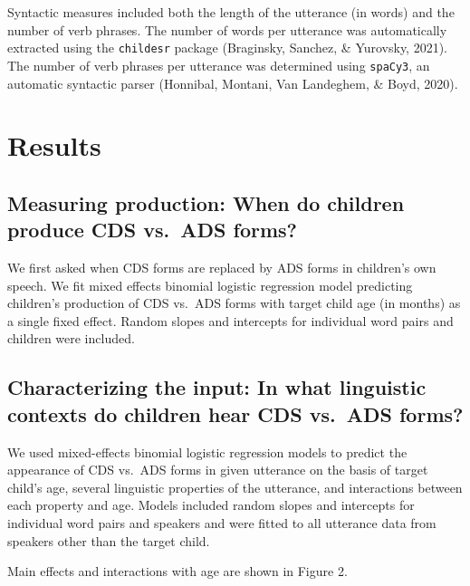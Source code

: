 \documentclass[10pt, letterpaper]{article}
\begin{document}
Syntactic measures included both the length of the utterance (in words)
and the number of verb phrases. The number of words per utterance was
automatically extracted using the \texttt{childesr} package (Braginsky,
Sanchez, \& Yurovsky, 2021). The number of verb phrases per utterance
was determined using \texttt{spaCy3}, an automatic syntactic parser
(Honnibal, Montani, Van Landeghem, \& Boyd, 2020).

\hypertarget{results}{%
\section{Results}\label{results}}

\hypertarget{measuring-production-when-do-children-produce-cds-vs.-ads-forms}{%
\subsection{Measuring production: When do children produce CDS vs.~ADS
forms?}\label{measuring-production-when-do-children-produce-cds-vs.-ads-forms}}

We first asked when CDS forms are replaced by ADS forms in children's
own speech. We fit mixed effects binomial logistic regression model
predicting children's production of CDS vs.~ADS forms with target child
age (in months) as a single fixed effect. Random slopes and intercepts
for individual word pairs and children were included.

\hypertarget{characterizing-the-input-in-what-linguistic-contexts-do-children-hear-cds-vs.-ads-forms}{%
\subsection{Characterizing the input: In what linguistic contexts do
children hear CDS vs.~ADS
forms?}\label{characterizing-the-input-in-what-linguistic-contexts-do-children-hear-cds-vs.-ads-forms}}

We used mixed-effects binomial logistic regression models to predict the
appearance of CDS vs.~ADS forms in given utterance on the basis of
target child's age, several linguistic properties of the utterance, and
interactions between each property and age. Models included random
slopes and intercepts for individual word pairs and speakers and were
fitted to all utterance data from speakers other than the target child.

Main effects and interactions with age are shown in Figure 2.
\end{document}
